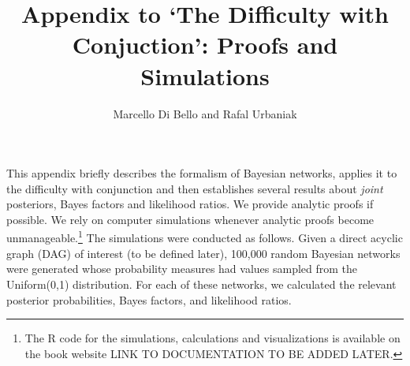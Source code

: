 \documentclass[
  10pt,
  dvipsnames,enabledeprecatedfontcommands]{scrartcl}
\title{Appendix to `The Difficulty with Conjuction': Proofs and
Simulations}
\author{Marcello Di Bello and Rafal Urbaniak}
\date{}
\begin{document}
\maketitle

This appendix briefly describes the formalism of Bayesian networks,
applies it to the difficulty with conjunction and then establishes
several results about \textit{joint} posteriors, Bayes factors and
likelihood ratios. We provide analytic proofs if possible. We rely on
computer simulations whenever analytic proofs become
unmanageable.\footnote{The R code for the simulations, calculations and
  visualizations is available on the book website LINK TO DOCUMENTATION
  TO BE ADDED LATER.} The simulations were conducted as follows. Given a
direct acyclic graph (DAG) of interest (to be defined later), 100,000
random Bayesian networks were generated whose probability measures had
values sampled from the \textsf{Uniform(0,1)} distribution. For each of
these networks, we calculated the relevant posterior probabilities,
Bayes factors, and likelihood ratios.
\end{document}
